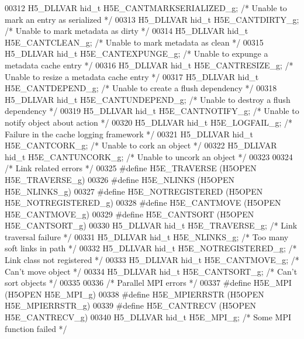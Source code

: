 \begin{DoxyCode}
00312 H5\_DLLVAR hid\_t H5E\_CANTMARKSERIALIZED\_g; \textcolor{comment}{/* Unable to mark an entry as serialized */}
00313 H5\_DLLVAR hid\_t H5E\_CANTDIRTY\_g;     \textcolor{comment}{/* Unable to mark metadata as dirty */}
00314 H5\_DLLVAR hid\_t H5E\_CANTCLEAN\_g;     \textcolor{comment}{/* Unable to mark metadata as clean */}
00315 H5\_DLLVAR hid\_t H5E\_CANTEXPUNGE\_g;   \textcolor{comment}{/* Unable to expunge a metadata cache entry */}
00316 H5\_DLLVAR hid\_t H5E\_CANTRESIZE\_g;    \textcolor{comment}{/* Unable to resize a metadata cache entry */}
00317 H5\_DLLVAR hid\_t H5E\_CANTDEPEND\_g;    \textcolor{comment}{/* Unable to create a flush dependency */}
00318 H5\_DLLVAR hid\_t H5E\_CANTUNDEPEND\_g;  \textcolor{comment}{/* Unable to destroy a flush dependency */}
00319 H5\_DLLVAR hid\_t H5E\_CANTNOTIFY\_g;    \textcolor{comment}{/* Unable to notify object about action */}
00320 H5\_DLLVAR hid\_t H5E\_LOGFAIL\_g;       \textcolor{comment}{/* Failure in the cache logging framework */}
00321 H5\_DLLVAR hid\_t H5E\_CANTCORK\_g;      \textcolor{comment}{/* Unable to cork an object */}
00322 H5\_DLLVAR hid\_t H5E\_CANTUNCORK\_g;    \textcolor{comment}{/* Unable to uncork an object */}
00323 
00324 \textcolor{comment}{/* Link related errors */}
00325 \textcolor{preprocessor}{#define H5E\_TRAVERSE         (H5OPEN H5E\_TRAVERSE\_g)}
00326 \textcolor{preprocessor}{#define H5E\_NLINKS           (H5OPEN H5E\_NLINKS\_g)}
00327 \textcolor{preprocessor}{#define H5E\_NOTREGISTERED    (H5OPEN H5E\_NOTREGISTERED\_g)}
00328 \textcolor{preprocessor}{#define H5E\_CANTMOVE         (H5OPEN H5E\_CANTMOVE\_g)}
00329 \textcolor{preprocessor}{#define H5E\_CANTSORT         (H5OPEN H5E\_CANTSORT\_g)}
00330 H5\_DLLVAR hid\_t H5E\_TRAVERSE\_g;      \textcolor{comment}{/* Link traversal failure */}
00331 H5\_DLLVAR hid\_t H5E\_NLINKS\_g;        \textcolor{comment}{/* Too many soft links in path */}
00332 H5\_DLLVAR hid\_t H5E\_NOTREGISTERED\_g; \textcolor{comment}{/* Link class not registered */}
00333 H5\_DLLVAR hid\_t H5E\_CANTMOVE\_g;      \textcolor{comment}{/* Can't move object */}
00334 H5\_DLLVAR hid\_t H5E\_CANTSORT\_g;      \textcolor{comment}{/* Can't sort objects */}
00335 
00336 \textcolor{comment}{/* Parallel MPI errors */}
00337 \textcolor{preprocessor}{#define H5E\_MPI              (H5OPEN H5E\_MPI\_g)}
00338 \textcolor{preprocessor}{#define H5E\_MPIERRSTR        (H5OPEN H5E\_MPIERRSTR\_g)}
00339 \textcolor{preprocessor}{#define H5E\_CANTRECV         (H5OPEN H5E\_CANTRECV\_g)}
00340 H5\_DLLVAR hid\_t H5E\_MPI\_g;           \textcolor{comment}{/* Some MPI function failed */}

\end{DoxyCode}
